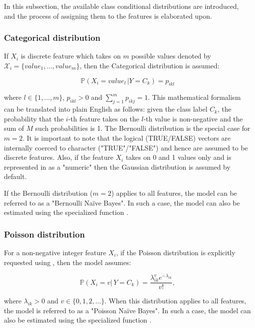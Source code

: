 \documentclass{article}\usepackage[]{graphicx}\usepackage[]{xcolor}
\begin{document}
In this subsection, the available class conditional distributions are introduced, and the process of assigning them to the features is elaborated upon.

\subsubsection{Categorical distribution}

If $X_i$ is discrete feature which takes on $m$ possible values denoted by $\mathcal{X}_i = \{value_1, \ldots, value_m\}$, then the Categorical distribution is assumed:

    $$\mathbb{P}(X_i = value_l \, | Y = C_k) = p_{ikl}$$


where $l \in \{1,\ldots,m\}$,  $p_{ikl} > 0$ and $\sum_{j = 1}^m p_{ikj} = 1$. This mathematical formalism can be translated into plain English as follows: given the class label $C_k$, the probability that the $i$-th feature takes on the $l$-th value is non-negative and the sum of $M$ such probabilities is 1. The Bernoulli distribution is the special case for $m=2$. It is important to note that the logical (TRUE/FALSE) vectors are internally coerced to character ("TRUE"/"FALSE") and hence are assumed to be discrete features. Also, if the feature $X_i$ takes on 0 and 1 values only and is represented in \textcolor{darkgreen}{{}} as a "numeric" then the Gaussian distribution is assumed by default.

If the Bernoulli distribution ($m=2$) applies to all features, the model can be referred to as a "Bernoulli Na\"ive Bayes". In such a case, the model can also be estimated using the specialized function \newline \textcolor{darkgreen}{{}}.

\subsubsection{Poisson distribution}

For a non-negative integer feature $X_i$, if the Poisson distribution is explicitly requested using \textcolor{darkgreen}{{}}, then the model assumes:

$$\mathbb{P}(X_i=v | \, Y = C_k) = \frac{\lambda_{ik}^v e^{-\lambda_{ik}}}{v!},$$

where $\lambda_{ik} > 0$ and $v \in \{0,1,2,\ldots\}$. When this distribution applies to all features, the model is referred to as a "Poisson Na\"ive Bayes". In such a case, the model can also be estimated using the specialized function \textcolor{darkgreen}{{}}.
\end{document}
